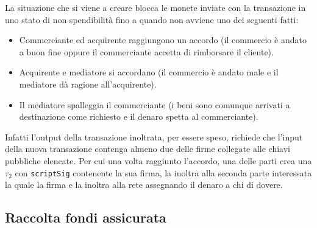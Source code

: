 La situazione che si viene a creare blocca le monete inviate con la transazione in uno stato di non spendibilità fino a quando non avviene uno dei seguenti fatti:
\begin{itemize}
    \item Commerciante ed acquirente raggiungono un accordo (il commercio è andato a buon fine oppure il commerciante accetta di rimborsare il cliente).
    \item Acquirente e mediatore si accordano (il commercio è andato male e il mediatore dà ragione all'acquirente).
    \item Il mediatore spalleggia il commerciante (i beni sono comunque arrivati a destinazione come richiesto e il denaro spetta al commerciante).
\end{itemize}
Infatti l'output della transazione inoltrata, per essere speso, richiede che l'input della nuova transazione contenga almeno due delle firme collegate alle chiavi pubbliche elencate. Per cui una volta raggiunto l'accordo, una delle parti crea una $\tau_2$ con \verb|scriptSig| contenente la sua firma, la inoltra alla seconda parte interessata la quale la firma e la inoltra alla rete assegnando il denaro a chi di dovere.

\subsection{Raccolta fondi assicurata}

